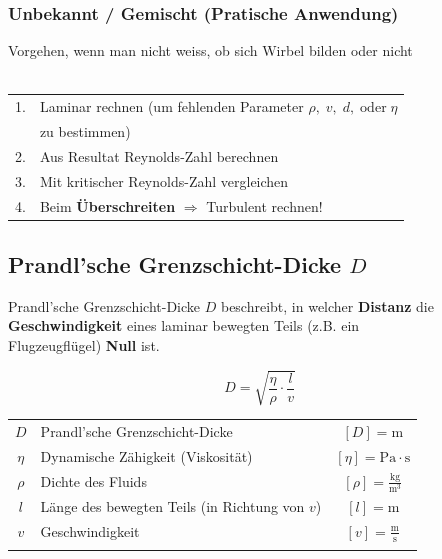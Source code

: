 \subsubsection{Unbekannt / Gemischt (Pratische Anwendung)}
Vorgehen, wenn man nicht weiss, ob sich Wirbel bilden oder nicht \\
\\
\begin{tabular}{ll}
1. & Laminar rechnen (um fehlenden Parameter $\rho, \; v, \; d, \; \mathrm{oder} \; \eta$ \\
   &  zu bestimmen) \\
2. & Aus Resultat Reynolds-Zahl berechnen \\
3. & Mit kritischer Reynolds-Zahl vergleichen \\
4. & Beim \textbf{Überschreiten} $\Rightarrow$ Turbulent rechnen! \\
\end{tabular}



\subsection{Prandl'sche Grenzschicht-Dicke $D$}
Prandl'sche Grenzschicht-Dicke $D$ beschreibt, in welcher \textbf{Distanz} die \textbf{Geschwindigkeit} eines laminar bewegten Teils (z.B. ein \\
Flugzeugflügel) \textbf{Null} ist. 

$$\boxed{ D = \sqrt{\frac{\eta}{\rho} \cdot \frac{l}{v}} }$$


\begin{tabular}{c l c}
		$D$ & Prandl'sche Grenzschicht-Dicke & $[D] = \mathrm{m}$ \\
		$\eta$ & Dynamische Zähigkeit (Viskosität) & $[\eta] = \mathrm{Pa \cdot s}$  \\
		\rule{0pt}{8pt}$\rho$ & Dichte des Fluids & $[\rho] = \mathrm{\frac{kg}{m^3}}$ \\
		$l$ & Länge des bewegten Teils (in Richtung von $v$) & $[l] = \mathrm{m}$ \\
		\rule{0pt}{8pt}$v$ & Geschwindigkeit & $[v] = \mathrm{\frac{m}{s}}$ \\
			\\
\end{tabular}

